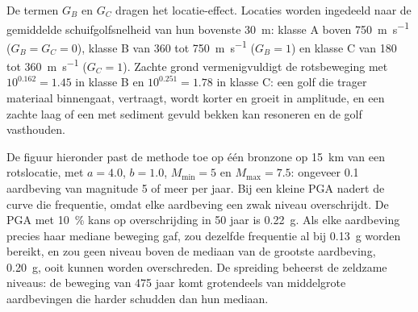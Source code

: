 De termen $G_B$ en $G_C$ dragen het locatie-effect. Locaties worden ingedeeld naar de gemiddelde
schuifgolfsnelheid van hun bovenste \qty{30}{m}: klasse A boven \qty{750}{m.s^{-1}} ($G_B = G_C = 0$), klasse B van
360 tot \qty{750}{m.s^{-1}} ($G_B = 1$) en klasse C van 180 tot \qty{360}{m.s^{-1}} ($G_C = 1$). Zachte
grond vermenigvuldigt de rotsbeweging met $10^{0.162} = 1.45$ in klasse B en $10^{0.251} = 1.78$ in klasse
C: een golf die trager materiaal binnengaat, vertraagt, wordt korter en groeit in amplitude, en een zachte laag of een
met sediment gevuld bekken kan resoneren en de golf vasthouden.

De figuur hieronder past de methode toe op één bronzone op \qty{15}{km} van een rotslocatie, met $a
= 4.0$, $b = 1.0$, $M_{\min} = 5$ en $M_{\max} = 7.5$: ongeveer 0.1 aardbeving van magnitude 5 of
meer per jaar. Bij een kleine PGA nadert de curve die frequentie, omdat elke aardbeving een zwak
niveau overschrijdt. De PGA met \qty{10}{\percent} kans op overschrijding in 50 jaar is \qty{0.22}{g}. Als elke aardbeving
precies haar mediane beweging gaf, zou dezelfde frequentie al bij \qty{0.13}{g} worden bereikt, en zou geen niveau boven de mediaan
van de grootste aardbeving, \qty{0.20}{g}, ooit kunnen worden overschreden. De spreiding beheerst de zeldzame
niveaus: de beweging van 475 jaar komt grotendeels van middelgrote aardbevingen die harder schudden dan hun
mediaan.

